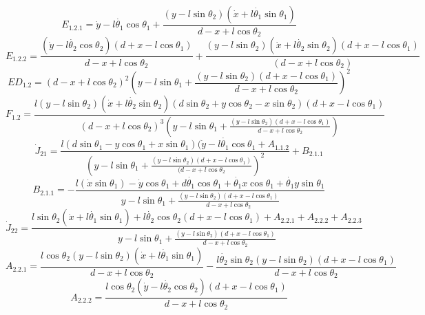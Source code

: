 \begin{equation*}
	E_{1.2.1} = \dot{y}-l\dot{\theta_1}\cos\theta_1+ \frac{(y-l\sin\theta_2)(\dot{x}+l\dot{\theta_1}\sin\theta_1)}{d-x+l\cos\theta_2}
\end{equation*}
\begin{equation*}
	E_{1.2.2} = \frac{(\dot{y}-l\dot{\theta_2}\cos\theta_2)(d+x-l\cos\theta_1)}{d-x+l\cos\theta_2}+\frac{(y-l\sin\theta_2)(\dot{x}+l\dot{\theta_2}\sin\theta_2)(d+x-l\cos\theta_1)}{{(d-x+l\cos\theta_2)}}
\end{equation*}
\begin{equation*}
ED_{1.2} =	(d-x+l\cos\theta_2)^2(y-l\sin\theta_1+\frac{(y-l\sin\theta_2)(d+x-l\cos\theta_1)}{d-x+l\cos\theta_2})^2
\end{equation*}
\begin{equation*}
	F_{1.2} = \frac{l(y-l\sin\theta_2)(\dot{x}+l\dot{\theta_2}\sin\theta_2)(d\sin\theta_2+y\cos\theta_2-x\sin\theta_2)(d+x-l\cos\theta_1)}
	{(d-x+l\cos\theta_2)^3(y-l\sin\theta_1+\frac{(y-l\sin\theta_2)(d+x-l\cos\theta_1)}{d-x+l\cos\theta_2})}
\end{equation*}
\begin{equation}
	\dot{J}_{21} =\frac{l(d\sin\theta_{1}-y\cos\theta_{1}+x\sin\theta_{1})(\dot{y}-
		l\dot{\theta_1}\cos\theta_{1}+A_{1.1.2}}{(y-l\sin\theta_1+\frac{(y-l\sin\theta_{2})(d+x-l\cos\theta_1)}{(d-x+l\cos\theta_2})^2}+B_{2.1.1}
\end{equation}
\begin{equation*}
B_{2.1.1} =  -\frac{l(\dot{x}\sin\theta_1)-\dot{y}\cos\theta_1+d\dot{\theta_1} \cos\theta_1+\dot{\theta_1}x\cos\theta_1+\dot{\theta_1}y\sin\theta_1}{y-l\sin\theta_1+\frac{(y-l\sin\theta_2)(d+x-l\cos\theta_1)}{d-x+l\cos\theta_2}}
\end{equation*}
\begin{equation}
\dot{J}_{22} = \frac{l\sin\theta_2(\dot{x}+l\dot{\theta_1}\sin\theta_1)+l\dot{\theta_2}\cos\theta_2(d+x-l\cos\theta_1)+A_{2.2.1}+A_{2.2.2}+A_{2.2.3}}{ {y-l\sin\theta_1+\frac{(y-l\sin\theta_2)(d+x-l\cos\theta_1)}{d-x+l\cos\theta_2}}}
\end{equation}
\begin{equation*}
A_{2.2.1} = \frac{l\cos\theta_2(y-l\sin\theta_2)(\dot{x}+l\dot{\theta_1}\sin\theta_1)}{d-x+l\cos\theta_2}-\frac{l\dot{\theta_2}\sin\theta_2(y-l\sin\theta_2)(d+x-l\cos\theta_1)}{d-x+l\cos\theta_2}
\end{equation*}
\begin{equation*}
A_{2.2.2} = \frac{l\cos\theta_2(\dot{y}-l\dot{\theta_2}\cos\theta_2)(d+x-l\cos\theta_1)}{d-x+l\cos\theta_2}
\end{equation*}
